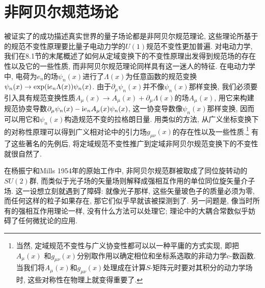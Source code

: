 \setcounter{chapter}{14}
\setcounter{section}{0}%

\chapter{非阿贝尔规范场论} \label{cha:15}


被证实了的成功描述真实世界的量子场论都是非阿贝尔规范理论, 这些理论所基于的规范不变性原理要比量子电动力学的$U(1)$规范不变性更加普遍. 
对电动力学, 我们在8.1节的末尾概述了如何从定域变换下的不变性原理出发得到规范场的存在性以及它的一些性质, 
而非阿贝尔规范理论同样具有这一迷人的特征. 
在电动力学中, 电荷为$e_{n}$的场$\psi _{n}(x)$进行了$\Lambda(x)$为任意函数的规范变换
$\psi _{n}(x)\to \exp(\mathrm{i} e_{n}\Lambda (x))\psi _{n}(x)$. 
由于$\partial _{\mu }\psi _{n}(x)$并不像$\psi_{n}(x)$那样变换, 
我们必须要引入具有规范变换性质$A_{\mu }(x)\to A_{\mu}(x)+\partial_{\mu}\Lambda(x)$的场$A_{\mu}(x)$, 
用它来构建规范协变导数$\partial_{\mu}\psi_{n}(x)-\mathrm{i} e_{n}A_{\mu}(x)\psi_{n}(x)$, 
这一协变导数像$\psi _{n}(x)$那样变换, 因而可以用它和$\psi_{n}(x)$构造规范不变的拉格朗日量. 
用类似的方法, 从广义坐标变换下的对称性原理可以得到广义相对论中的引力场$g_{\mu \nu }(x)$的存在性以及一些性质.\footnote{当然, 
定域规范不变性与广义协变性都可以以一种平庸的方式实现, 即把$A_{\mu }(x)$
和$g_{\mu \nu }(x)$分别取作用以确定相位和坐标系选取的非动力学c-数函数. 
当我们将$A_{\mu }(x)$和$g_{\mu \nu }(x)$处理成在计算$S$-矩阵元时要对其积分的动力学场时, 
这些对称性在物理上就变得重要了.} 有了这些著名的先例后, 将定域规范不变性推广到定域非阿贝尔规范变换下的不变性就很自然了.


在杨振宁和Mills 1954年的原始工作中,\cite{1} 非阿贝尔规范群被取成了同位旋转动的$SU(2)$群, 
而类似于光子场的矢量场则解释成强相互作用的单位同位旋矢量介子场. 这一设想立刻就遇到了障碍: 
就像光子那样, 这些矢量玻色子的质量必须为零, 而任何这样的粒子如果存在, 那它们似乎早就该被探测到了. 
另一问题是, 像当时所有的强相互作用理论一样, 没有什么方法可以处理它; 
理论中的大耦合常数似乎妨碍了任何微扰论的应用.

